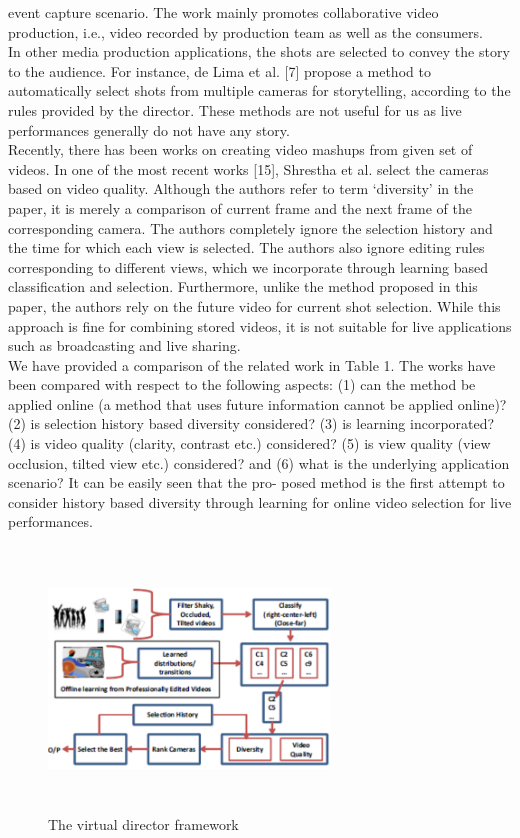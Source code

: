 \documentclass{sig-alternate}
\begin{document}
event capture scenario. The work mainly promotes collaborative
video production, i.e., video recorded by production team as well
as the consumers.\\
In other media production applications, the shots are selected to
convey the story to the audience. For instance, de Lima et al. [7]
propose a method to automatically select shots from multiple cameras for storytelling, according to the rules provided by the director.
These methods are not useful for us as live performances generally
do not have any story.\\
Recently, there has been works on creating video mashups from
given set of videos. In one of the most recent works [15], Shrestha
et al. select the cameras based on video quality. Although the authors refer to term ‘diversity’ in the paper, it is merely a comparison of current frame and the next frame of the corresponding camera. The authors completely ignore the selection history and the
time for which each view is selected. The authors also ignore editing rules corresponding to different views, which we incorporate
through learning based classification and selection. Furthermore,
unlike the method proposed in this paper, the authors rely on the
future video for current shot selection. While this approach is fine
for combining stored videos, it is not suitable for live applications
such as broadcasting and live sharing.\\




We have provided a comparison of the related work in Table 1.
The works have been compared with respect to the following aspects: (1) can the method be applied online (a method that uses future information cannot be applied online)? (2) is selection history based diversity considered? (3) is learning incorporated? (4) is
video quality (clarity, contrast etc.) considered? (5) is view quality
(view occlusion, tilted view etc.) considered? and (6) what is the
underlying application scenario? It can be easily seen that the pro-
posed method is the first attempt to consider history based diversity
through learning for online video selection for live performances.
\begin{figure}[h!]
   \centering
  \includegraphics[width=7.5cm, height=7cm]{video_6.pdf}
\caption{The virtual director framework}
\end{figure}
\end{document}
